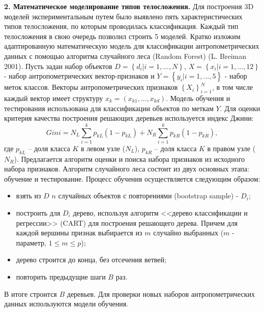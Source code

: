 \textbf{2. Математическое моделирование типов телосложения.} Для построения 3D моделей экспериментальным путем было выявлено пять характеристических типов телосложения, по которым проводилась классификация. Каждый тип телосложения в свою очередь позволил строить 5 моделей. Кратко изложим адаптированную математическую модель для классификации антропометрических данных с помощью алгоритма случайного леса (Random Forest) (L. Breiman 2001). Пусть задан набор объектов $D=\left\{d_i|i=1, ..., N\right\}$, $X=\left\{x_i|i=1, ..., 12\right\}$ - набор антропометрических вектор-признаков и $Y=\left\{y_i|i=1, ..., 5\right\}$ - набор меток классов. Векторы антропометрических признаков $\left\{X_i\right\}^N_{i=1}$, в том числе каждый вектор имеет структуру $x_k=\left(x_{k1}, ..., x_{kd}\right)$. Модель обучения и тестирования использована для классификации объектов по меткам $Y$. Для оценки критерия качества построения решающих деревьев используется индекс Джини:
\begin{equation}\label{eq27}
Gini=N_L\sum^k_{i=1} p_{kL} \left(1-p_{kL}\right) + N_R\sum^k_{i=1} p_{kR} \left(1-p_{kR}\right),
\end{equation}
где $p_{kL}$ -- доля класса $K$ в левом узле ($N_L$), $p_{kR}$ -- доля класса $K$ в правом узле ($N_R$).
Предлагается алгоритм оценки и поиска набора признаков из исходного набора признаков. Алгоритм случайного леса состоит из двух основных этапа: обучение и тестирование. Процесс обучения осуществляется следующим образом:

\begin{itemize}
	\item взять из $D$ $n$ случайных объектов с повторениями (bootstrap sample) - $D_i$;
	\item построить для $D_i$ дерево, используя алгоритм <<дерево классификации и регрессии>> (CART) для построения решающего дерева. Причем для каждой вершины признак выбирается из $m$ случайно выбранных ($m$ - параметр, $1\leq m\leq p$);
	\item дерево строится до конца, без отсечения ветвей;
	\item повторить предыдущие шаги $B$ раз.
\end{itemize}
В итоге строится $B$ деревьев. Для проверки новых наборов антропометрических данных используются модели обучения.

